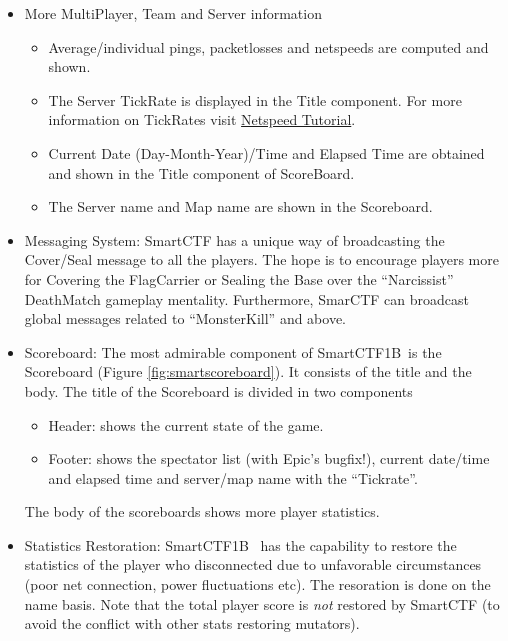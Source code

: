 \documentclass{article}
\newcommand{\SmartVersion}{1B}
\begin{document}
\begin{itemize}
\item More MultiPlayer, Team and Server information
  \begin{itemize}
  \item Average/individual pings, packetlosses and netspeeds are computed and shown.
  \item The Server TickRate is displayed in the Title component.  For more information on TickRates visit \href{http://wiki.unrealadmin.org/Netspeed_Tutorial_(UT)}{\color{Blue}Netspeed Tutorial}.
  \item Current Date (Day-Month-Year)/Time and Elapsed Time are obtained and shown in the Title component of ScoreBoard.
  \item The Server name and Map name are shown in the Scoreboard.
  \end{itemize}
\item Messaging System: SmartCTF has a unique way of broadcasting the Cover/Seal message to all the players.  The hope is to encourage players more for Covering the FlagCarrier or Sealing the Base over the ``Narcissist'' DeathMatch gameplay mentality.  Furthermore, SmarCTF can broadcast global messages related to ``MonsterKill'' and above.
  \item Scoreboard: The most admirable component of SmartCTF\SmartVersion~is the Scoreboard (Figure \ref{fig:smartscoreboard}).  It consists of the title and the body.  The title of the Scoreboard is divided in two components
    \begin{itemize}
    \item Header: shows the current state of the game.
    \item Footer: shows the spectator list (with Epic's bugfix!), current date/time and elapsed time
    and server/map name with the ``Tickrate''.
    \end{itemize}
The body of the scoreboards shows more player statistics.
\item Statistics Restoration: SmartCTF\SmartVersion~ has the capability to restore the statistics of the player who disconnected due to unfavorable circumstances (poor net connection, power fluctuations etc).  The resoration is done on the name basis.  Note that the total player score is \emph{not} restored by SmartCTF (to avoid the conflict with other stats restoring mutators).

\end{itemize}
\end{document}

